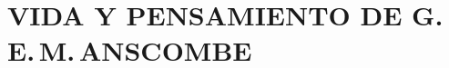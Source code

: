 \documentclass[../main.tex]{subfiles}
\begin{document}
\setcounter{chapter}{1}

\chapter{VIDA Y PENSAMIENTO DE G.\,E.\,M.\,ANSCOMBE}






\end{document}
